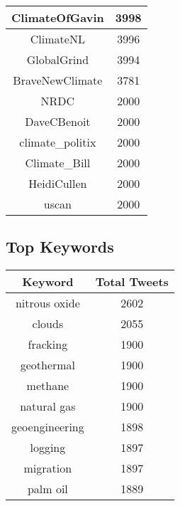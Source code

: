 \documentclass{article}\usepackage[T1]{fontenc}
\begin{document}
\begin{center}
\begin{tabular}{|c|c|}
 \hline
ClimateOfGavin & 3998\\ 
 \hline
ClimateNL & 3996\\ 
 \hline
GlobalGrind & 3994\\ 
 \hline
BraveNewClimate & 3781\\ 
 \hline
NRDC & 2000\\ 
 \hline
DaveCBenoit & 2000\\ 
 \hline
climate_politix & 2000\\ 
 \hline
Climate_Bill & 2000\\ 
 \hline
HeidiCullen & 2000\\ 
 \hline
uscan & 2000\\ 
 \hline
\end{tabular}\end{center}\subsection*{Top Keywords}\begin{center}         \begin{tabular}{|c|c|}         \hline         Keyword & Total Tweets \\ 
 \hline
nitrous oxide & 2602\\ 
 \hline
clouds & 2055\\ 
 \hline
fracking & 1900\\ 
 \hline
geothermal & 1900\\ 
 \hline
methane & 1900\\ 
 \hline
natural gas & 1900\\ 
 \hline
geoengineering & 1898\\ 
 \hline
logging & 1897\\ 
 \hline
migration & 1897\\ 
 \hline
palm oil & 1889\\ 
 \hline
\end{tabular}\end{center}
\end{document}
